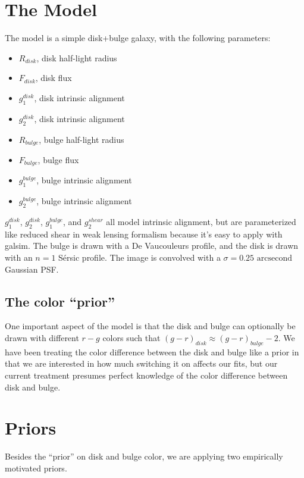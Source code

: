 \documentclass{article}
\begin{document}
\section{The Model}
The model is a simple disk+bulge galaxy, with the following parameters:
\begin{itemize}
\item $R_{disk}$, disk half-light radius
\item $F_{disk}$, disk flux
\item $g_1^{disk}$, disk intrinsic alignment
\item $g_2^{disk}$, disk intrinsic alignment
\item $R_{bulge}$, bulge half-light radius
\item $F_{bulge}$, bulge flux
\item $g_1^{bulge}$, bulge intrinsic alignment
\item $g_2^{bulge}$, bulge intrinsic alignment
\end{itemize}
$g_1^{disk}$, $g_2^{disk}$, $g_1^{bulge}$, and $g_2^{shear}$ all model
intrinsic alignment, but are parameterized like reduced shear in weak
lensing formalism because it's easy to apply with galsim.  The bulge
is drawn with a De Vaucouleurs profile, and the disk is drawn with an
$n=1$ S\'{e}rsic profile.  The image is convolved with a $\sigma = 0.25
\textrm{ arcsecond}$ Gaussian PSF.

\subsection{The color ``prior''}
One important aspect of the model is that the disk and bulge can
optionally be drawn with different $r-g$ colors such that
$(g-r)_{disk} \approx (g-r)_{bulge} - 2$.   We have
been treating the color difference between the disk and bulge like a
prior in that we are interested in how much switching it on affects
our fits, but our current treatment presumes perfect knowledge of the
color difference between disk and bulge.


\section{Priors}
Besides the ``prior'' on disk and bulge color, we are applying two
empirically motivated priors.
\end{document}
